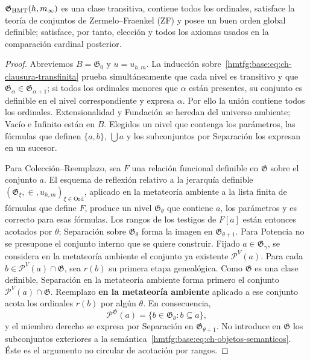 \begin{lemma}
\label{hmtfg:base:thm:ch-6b}
\(\mathfrak G_{\rm HMT}(h,m_\infty)\) es una clase transitiva, contiene todos
los ordinales, satisface la teoría de conjuntos de Zermelo--Fraenkel (ZF) y
posee un buen orden global definible; satisface,
por tanto, elección y todos los axiomas usados en la comparación cardinal posterior.

\end{lemma}
\begin{proof}
Abreviemos \(B=\mathfrak G_0\) y \(u=u_{h,m}\). La inducción
sobre~\eqref{hmtfg:base:eq:ch-clausura-transfinita} prueba simultáneamente que cada nivel es transitivo y que
\(\mathfrak G_\alpha\in\mathfrak G_{\alpha+1}\); si todos los ordinales
menores que \(\alpha\) están presentes, su conjunto es definible en el nivel
correspondiente y expresa \(\alpha\). Por ello la unión contiene todos los
ordinales. Extensionalidad y Fundación se heredan del universo ambiente;
Vacío e Infinito están en \(B\). Elegidos un nivel que contenga los parámetros,
las fórmulas que definen \(\{a,b\}\), \(\bigcup a\) y los subconjuntos por
Separación los expresan en un sucesor.

Para Colección--Reemplazo, sea \(F\) una relación funcional definible en
\(\mathfrak G\) sobre el conjunto \(a\). El esquema de reflexión relativo a
la jerarquía definible \((\mathfrak G_\xi,\in,u_{h,m})_{\xi\in\mathrm{Ord}}\),
aplicado en la metateoría ambiente a la lista finita de fórmulas que define
\(F\), produce un nivel
\(\mathfrak G_\theta\) que contiene \(a\), los parámetros y es correcto para
esas fórmulas. Los rangos de los testigos de \(F[a]\) están entonces acotados
por \(\theta\); Separación sobre \(\mathfrak G_\theta\) forma la imagen en
\(\mathfrak G_{\theta+1}\). Para Potencia no se presupone el conjunto interno
que se quiere construir. Fijado \(a\in\mathfrak G_\gamma\), se considera en
la metateoría ambiente el conjunto ya existente \(\mathcal P^V(a)\). Para
cada \(b\in\mathcal P^V(a)\cap\mathfrak G\), sea \(r(b)\) su primera etapa
genealógica. Como \(\mathfrak G\) es una clase definible, Separación en la
metateoría ambiente forma primero el conjunto
\(\mathcal P^V(a)\cap\mathfrak G\). Reemplazo \textbf{en la metateoría ambiente}
aplicado a ese conjunto acota los ordinales \(r(b)\) por algún \(\theta\).
En consecuencia,
\[
 \mathcal P^{\mathfrak G}(a)
 =\{b\in\mathfrak G_\theta:b\subseteq a\},
\]
y el miembro derecho se expresa por Separación en
\(\mathfrak G_{\theta+1}\). No introduce en \(\mathfrak G\) los subconjuntos
exteriores a la semántica~\eqref{hmtfg:base:eq:ch-objetos-semanticos}. Éste es el argumento no circular de
acotación por rangos.


\end{proof}
